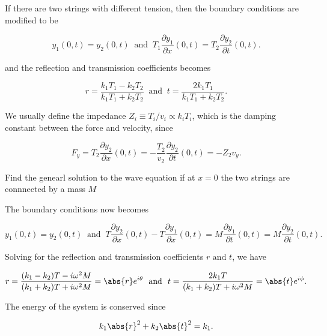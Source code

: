 \documentclass[a4paper,12pt]{report}
\begin{document}
{If there are two strings with different tension, then the boundary conditions are modified to be 

\begin{equation}
	y_1(0,t) = y_2(0,t) ~\text { and }~ T_1 \frac{\partial y_1 }{\partial x}(0,t) = T_2 \frac{\partial y_2 }{\partial t}(0,t).    
\end{equation}

and the reflection and transmission coefficients becomes

\begin{equation}
	r = \frac{k_1T_1  - k_2T_2  }{k_1T_1  + k_2T_2  } ~\text { and }~ t = \frac{2 k_1T_1  }{k_1T_1  + k_2T_2  }.
\end{equation}

We usually define the impedance \(Z_{i} \equiv T_{i} / v_{i} \propto k_{i} T_{i}   \), which is the damping constant between the force and velocity, since

\begin{equation}
	F_{y} = T_{2}\frac{\partial y_{2} }{\partial x}(0,t) = -\frac{T_{2}}{v_{2} }\frac{\partial y_{2} }{\partial t}(0,t) = - Z_{2}v_{y}.    
\end{equation}

} 

{Find the genearl solution to the wave equation if at \(x=0\) the two strings are connnected by a mass \(M\)}
{The boundary conditions now becomes

\begin{equation}
	y_1 (0,t) = y_2 (0,t) ~\text { and }~ T\frac{\partial y_2 }{\partial x}(0,t) - T\frac{\partial y_1 }{\partial x}(0,t) = M \frac{\partial y_1 }{\partial t}(0,t)=M \frac{\partial y_2 }{\partial t}(0,t).    
\end{equation}

Solving for the reflection and transmission coefficients \(r \text { and } t\), we have

\begin{equation}
	r = \frac{(k_1 -k_2 )T-i \omega ^2M}{(k_1 +k_2 )T+i \omega ^2M} = \abs{r}e^{i \theta } ~\text { and }~ t = \frac{2 k_1 T}{(k_1 +k_2 )T + i \omega ^2M} = \abs{t} e^{i \phi  }.  
\end{equation}

The energy of the system is conserved since 

\begin{equation}
	k_{1} \abs{r} ^2+ k_{2} \abs{t} ^2 = k_{1} . 
\end{equation}
} 
\end{document}
